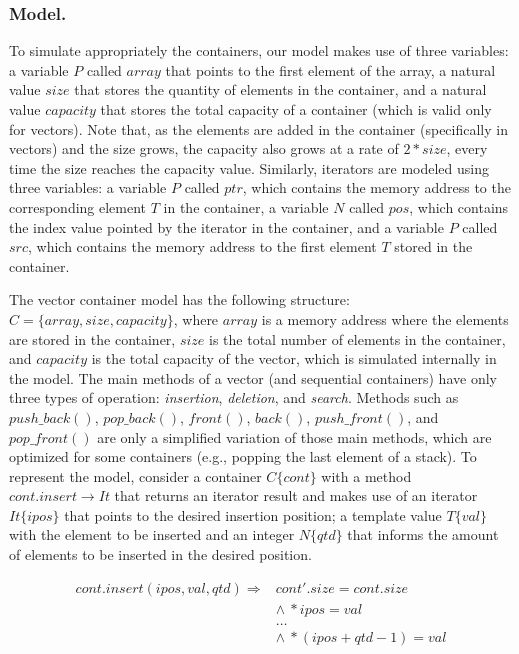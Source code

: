 \documentclass[a4paper]{llncs}
\begin{document}
\subsubsection{Model.}

To simulate appropriately the containers, our model makes 
use of three variables: a variable $P$ called $array$ that points 
to the first element of the array, a natural value $size$ that stores 
the quantity of elements in the container, and a natural value $capacity$
that stores the total capacity of a container (which is valid only for vectors). 
Note that, as the elements are added in the container (specifically in vectors) 
and the size grows, the capacity also grows at a rate of $2*size$, every time 
the size reaches the capacity value. Similarly, iterators are modeled using 
three variables: a variable $P$ called $ptr$, which contains the memory address 
to the corresponding element $T$ in the container, a variable $N$ called $pos$, 
which contains the index value pointed by the iterator in the container, and a 
variable $P$ called $src$, which contains the memory address to the first 
element $T$ stored in the container. 

The vector container model has the following structure:
$C = \{ array, size, capacity\}$,
where $array$ is a memory address where the elements are stored in the container, 
$size$ is the total number of elements in the container, and $capacity$ 
is the total capacity of the vector, which is simulated internally in the model.
The main methods of a vector (and sequential containers) have only 
three types of operation: \textit{insertion}, \textit{deletion}, and \textit{search}. 
Methods such as $push\_back\left(\right)$, $pop\_back\left(\right)$, $front\left(\right)$, 
$back\left(\right)$, $push\_front\left(\right)$, and $pop\_front\left(\right)$ are only 
a simplified variation of those main methods, which are optimized for some containers 
(e.g., popping the last element of a stack).
%
To represent the model, consider a container $C\{cont\}$ with a method 
$cont.insert \rightarrow It$ that returns an iterator result and 
makes use of an iterator $It\{ipos\}$ that points to the desired 
insertion position; a template value $T\{val\}$ with the element 
to be inserted and an integer $N\{qtd\}$ that informs the amount 
of elements to be inserted in the desired position.

\[\begin{array}{ll}
cont.insert(ipos, val, qtd) \Longrightarrow & cont'.size = cont.size \\
  & \wedge \: *ipos = val \\
  & \ldots \\
  & \wedge \: *(ipos + qtd - 1) = val \\
\end{array}\]
\end{document}
